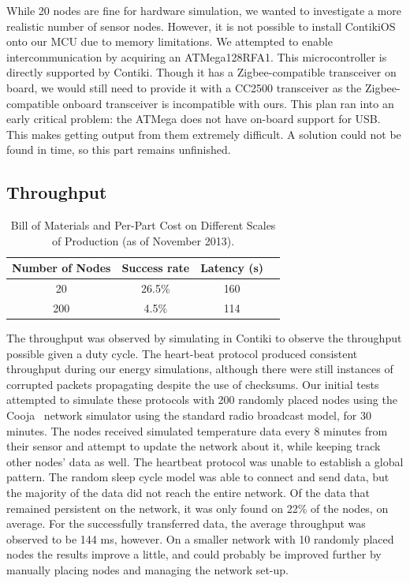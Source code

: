 While 20 nodes are fine for hardware simulation, we wanted to investigate a more realistic number of sensor nodes. However, it is not possible to install ContikiOS onto our MCU due to memory limitations. We attempted to enable intercommunication by acquiring an ATMega128RFA1. This microcontroller is directly supported by Contiki. Though it has a Zigbee-compatible transceiver on board, we would still need to provide it with a CC2500 transceiver as the Zigbee-compatible onboard transceiver is incompatible with ours. This plan ran into an early critical problem: the ATMega does not have on-board support for USB. This makes getting output from them extremely difficult. A solution could not be found in time, so this part remains unfinished.

\subsection{Throughput}

%
%
\begin{table}%
  \begin{center}
  
  \begin{tabular}{| c | c | c | c |}

  \hline
  \textbf{Number of Nodes} & \textbf{Success rate} & \textbf{Latency (s)} \\
  \hline

  20               & 26.5\% & 160 \\
  200              & 4.5\% & 114 \\

  \hline
  
  \end{tabular}  
  \end{center}
  \caption{Bill of Materials and Per-Part Cost on Different Scales of Production (as of November 2013).
  \label{table:bill}
  }
\end{table}

The throughput was observed by simulating in Contiki to observe the throughput possible given a duty cycle.  The heart-beat
protocol produced consistent throughput during our energy simulations, although there were still instances of corrupted packets
propagating despite the use of checksums.  Our initial tests attempted to simulate these protocols with 200 randomly placed nodes using the
Cooja~\cite{cooja} network simulator using the standard radio broadcast model, for 30 minutes.  The nodes received simulated
temperature data every 8 minutes from their sensor and attempt to update the network about it, while keeping track other nodes'
data as well.  The heartbeat protocol was unable
to establish a global pattern.  The random sleep cycle model was able to connect and send data, but the majority of the data
did not reach the entire network.  Of the data that remained persistent on the network, it was only found on 22\% of the nodes,
on average.  For the successfully transferred data, the average throughput was observed to be 144 ms, however.  On a smaller
network with 10 randomly placed nodes the results improve a little, and could probably be improved further by manually placing
nodes and managing the network set-up.
